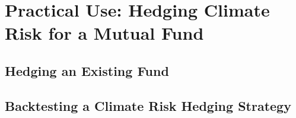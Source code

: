 \chapter{Practical Use: Hedging Climate Risk 
for a Mutual Fund}


\section{Hedging an Existing Fund}


\section{Backtesting a Climate Risk Hedging Strategy}